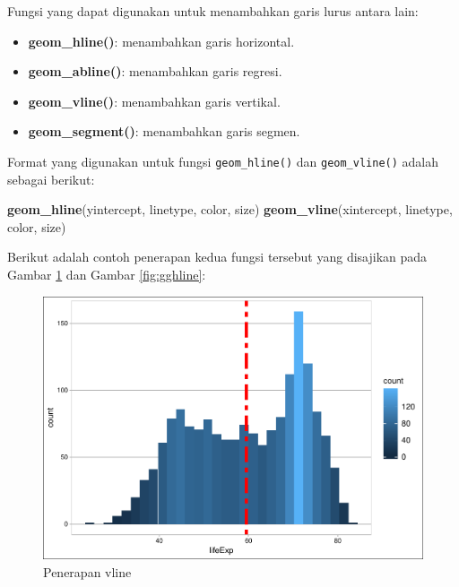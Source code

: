 \documentclass[]{book}
\newenvironment{Shaded}{\begin{snugshade}}{\end{snugshade}}
\newcommand{\KeywordTok}[1]{\textcolor[rgb]{0.13,0.29,0.53}{\textbf{#1}}}
\newcommand{\DataTypeTok}[1]{\textcolor[rgb]{0.13,0.29,0.53}{#1}}
\newcommand{\FloatTok}[1]{\textcolor[rgb]{0.00,0.00,0.81}{#1}}
\newcommand{\StringTok}[1]{\textcolor[rgb]{0.31,0.60,0.02}{#1}}
\newcommand{\CommentTok}[1]{\textcolor[rgb]{0.56,0.35,0.01}{\textit{#1}}}
\newcommand{\OperatorTok}[1]{\textcolor[rgb]{0.81,0.36,0.00}{\textbf{#1}}}
\newcommand{\NormalTok}[1]{#1}
\providecommand{\tightlist}{%
  \setlength{\itemsep}{0pt}\setlength{\parskip}{0pt}}
\begin{document}
Fungsi yang dapat digunakan untuk menambahkan garis lurus antara lain:

\begin{itemize}
\tightlist
\item
  \textbf{geom\_hline()}: menambahkan garis horizontal.
\item
  \textbf{geom\_abline()}: menambahkan garis regresi.
\item
  \textbf{geom\_vline()}: menambahkan garis vertikal.
\item
  \textbf{geom\_segment()}: menambahkan garis segmen.
\end{itemize}

Format yang digunakan untuk fungsi \texttt{geom\_hline()} dan
\texttt{geom\_vline()} adalah sebagai berikut:

\begin{Shaded}
\begin{Highlighting}[]
\KeywordTok{geom_hline}\NormalTok{(yintercept, linetype, color, size)}
\KeywordTok{geom_vline}\NormalTok{(xintercept, linetype, color, size)}
\end{Highlighting}
\end{Shaded}

Berikut adalah contoh penerapan kedua fungsi tersebut yang disajikan
pada Gambar \ref{fig:ggvline} dan Gambar \ref{fig:gghline}:

\begin{Shaded}
\end{Shaded}

\begin{figure}

{\centering \includegraphics[width=0.7\linewidth]{EnvStat_files/figure-latex/ggvline-1} 

}

\caption{Penerapan vline}\label{fig:ggvline}
\end{figure}
\end{document}
